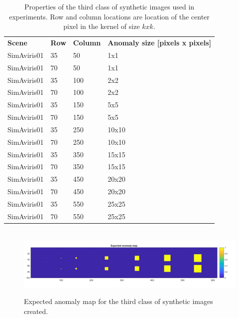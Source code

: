 \begin{table}[H]
\centering
\caption{Properties of the third class of synthetic images used in experiments. Row and column locations are location of the center pixel in the kernel of size $k x k$.}
\label{tab:synthetic_images}
\begin{tabular}{l|l|l|l}
\textbf{Scene} & \textbf{Row} & \textbf{Column} & \textbf{Anomaly size {[}pixels x pixels{]}} \\
SimAviris01    & 35           & 50              & 1x1                                         \\
SimAviris01    & 70           & 50              & 1x1                                         \\
SimAviris01    & 35           & 100             & 2x2                                         \\
SimAviris01    & 70           & 100             & 2x2                                         \\
SimAviris01    & 35           & 150             & 5x5                                         \\
SimAviris01    & 70           & 150             & 5x5                                         \\
SimAviris01    & 35           & 250             & 10x10                                       \\
SimAviris01    & 70           & 250             & 10x10                                       \\
SimAviris01   & 35           & 350             & 15x15                                       \\
SimAviris01    & 70           & 350             & 15x15                                       \\
SimAviris01    & 35           & 450             & 20x20                                       \\
SimAviris01    & 70           & 450             & 20x20                                       \\
SimAviris01    & 35           & 550             & 25x25                                       \\
SimAviris01    & 70           & 550             & 25x25                                      
\end{tabular}
\end{table}



\begin{figure}[H]
\hbox{\hspace*{-0}                                              
   \includegraphics[scale=0.4]{images/AD_testing/synthetic_images/expected_anomaly_map.png}}
  \caption{Expected anomaly map for the third class of synthetic images created.} 
  \label{fig:anomaly_map_615_100}
\end{figure}

